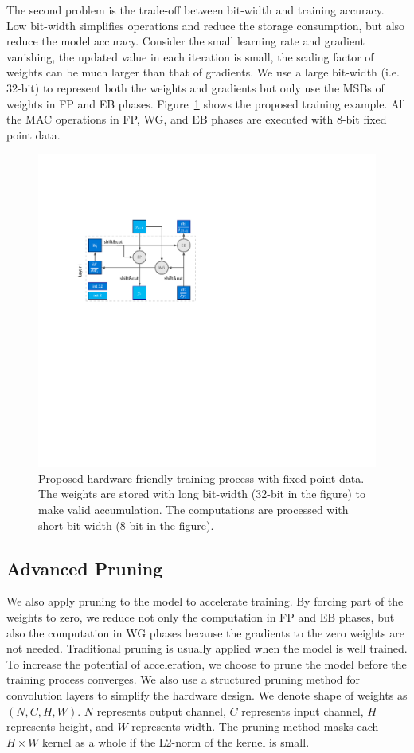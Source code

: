 The second problem is the trade-off between bit-width and training accuracy. Low bit-width simplifies operations and reduce the storage consumption, but also reduce the model accuracy. Consider the small learning rate and gradient vanishing, the updated value in each iteration is small, the scaling factor of weights can be much larger than that of gradients. We use a large bit-width (i.e. 32-bit) to represent both the weights and gradients but only use the MSBs of weights in FP and EB phases. Figure~\ref{fig:fixed_train} shows the proposed training example. All the MAC operations in FP, WG, and EB phases are executed with 8-bit fixed point data.  

\begin{figure}[tb]
  \centering 
  \includegraphics[width=0.9\columnwidth]{figures/fixed_train.pdf}
  \caption{Proposed hardware-friendly training process with fixed-point data. The weights are stored with long bit-width (32-bit in the figure) to make valid accumulation. The computations are processed with short bit-width (8-bit in the figure).}
  \label{fig:fixed_train}
\end{figure}

\subsection{Advanced Pruning}\label{sec:training:prune}

We also apply pruning to the model to accelerate training. By forcing part of the weights to zero, we reduce not only the computation in FP and EB phases, but also the computation in WG phases because the gradients to the zero weights are not needed. Traditional pruning is usually applied when the model is well trained. To increase the potential of acceleration, we choose to prune the model before the training process converges. We also use a structured pruning method for convolution layers to simplify the hardware design. We denote shape of weights as $(N, C, H, W)$. $N$ represents output channel, $C$ represents input channel, $H$ represents height, and $W$ represents width. The pruning method masks each $H\times W$ kernel as a whole if the L2-norm of the kernel is small. 

